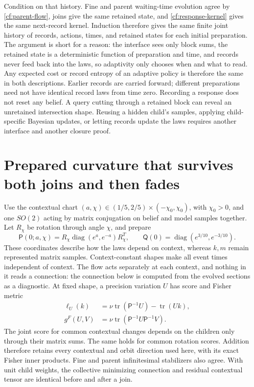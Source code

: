 Condition on that history. Fine and parent waiting-time evolution agree by \cref{cf:parent-flow}, joins give the same retained state, and \cref{cf:response-kernel} gives the same next-record kernel. Induction therefore gives the same finite joint history of records, actions, times, and retained states for each initial preparation. The argument is short for a reason: the interface sees only block sums, the retained state is a deterministic function of preparation and time, and records never feed back into the laws, so adaptivity only chooses when and what to read. Any expected cost or record entropy of an adaptive policy is therefore the same in both descriptions. Earlier records are carried forward; different preparations need not have identical record laws from time zero. Recording a response does not reset any belief. A query cutting through a retained block can reveal an unretained intersection shape. Reusing a hidden child's samples, applying child-specific Bayesian updates, or letting records update the laws requires another interface and another closure proof.

\section{Prepared curvature that survives both joins and then fades}
\label{cf:geometry}

Use the contextual chart $(a,\chi)\in(1/5,2/5)\times(-\chi_0,\chi_0)$, with $\chi_0>0$, and one $SO(2)$ acting by matrix conjugation on belief and model samples together. Let $R_\chi$ be rotation through angle $\chi$, and prepare
\begin{equation}
 \mathsf P(0;a,\chi)=R_\chi
 \operatorname{diag}(e^a,e^{-a})R_\chi^T,
 \qquad
 \mathsf Q(0)=\operatorname{diag}(e^{3/10},e^{-3/10}).
 \label{cf:section}
\end{equation}
These coordinates describe how the laws depend on context, whereas $k,m$ remain represented matrix samples. Context-constant shapes make all event times independent of context. The flow acts separately at each context, and nothing in it reads a connection: the connection below is computed from the evolved sections as a diagnostic. At fixed shape, a precision variation $U$ has score and Fisher metric
\begin{equation}
 \begin{aligned}
 \ell_U(k)&=\nu\operatorname{tr}(\mathsf P^{-1}U)-\operatorname{tr}(Uk),\\
 g^F(U,V)&=\nu\operatorname{tr}(\mathsf P^{-1}U\mathsf P^{-1}V).
 \end{aligned}
 \label{cf:score}
\end{equation}
The joint score for common contextual changes depends on the children only through their matrix sums. The same holds for common rotation scores. Addition therefore retains every contextual and orbit direction used here, with its exact Fisher inner products. Fine and parent infinitesimal stabilizers also agree. With unit child weights, the collective minimizing connection and residual contextual tensor are identical before and after a join.

